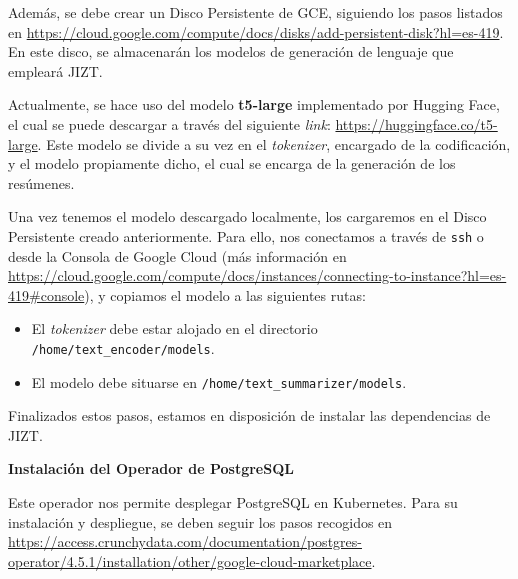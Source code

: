 Además, se debe crear un Disco Persistente de GCE, siguiendo los pasos listados en \href{https://cloud.google.com/compute/docs/disks/add-persistent-disk?hl=es-419}{https://cloud.google.com/compute/docs/disks/add-persistent-disk?hl=es-419}. En este disco, se almacenarán los modelos de generación de lenguaje que empleará JIZT.

Actualmente, se hace uso del modelo \textbf{t5-large} implementado por Hugging Face, el cual se puede descargar a través del siguiente \emph{link}: \href{https://huggingface.co/t5-large}{https://huggingface.\newline co/t5-large}. Este modelo se divide a su vez en el \emph{tokenizer}, encargado de la codificación, y el modelo propiamente dicho, el cual se encarga de la generación de los resúmenes.

Una vez tenemos el modelo descargado localmente, los cargaremos en el Disco Persistente creado anteriormente. Para ello, nos conectamos a través de \texttt{ssh} o desde la Consola de Google Cloud (más información en \href{https://cloud.google.com/compute/docs/instances/connecting-to-instance?hl=es-419#console}{https://cloud.google.com/compute/docs/instances/connecting-to-instance?\newline hl=es-419\#console}), y copiamos el modelo a las siguientes rutas:

\vspace{-0.2cm}
\begin{itemize} [\textbullet]
	\tightlist
	\item El \emph{tokenizer} debe estar alojado en el directorio \\ \texttt{/home/text\_encoder/models}.
	\item El modelo debe situarse en \texttt{/home/text\_summarizer/models}.
\end{itemize}

Finalizados estos pasos, estamos en disposición de instalar las dependencias de JIZT.

\vspace{0.5cm}
\noindent
\textbf{Instalación del Operador de PostgreSQL}

Este operador nos permite desplegar PostgreSQL en Kubernetes. Para su instalación y despliegue, se deben seguir los pasos recogidos en \href{https://access.crunchydata.com/documentation/postgres-operator/4.5.1/installation/other/google-cloud-marketplace}{https://access.crunchydata.com/documentation/postgres-operator/4.5.1/\newline installation/other/google-cloud-marketplace}.

